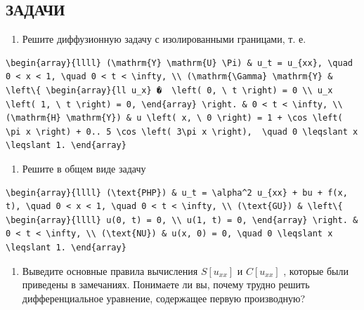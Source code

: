 \documentclass[
  ukrainian,
]{article}
\providecommand{\tightlist}{%
  \setlength{\itemsep}{0pt}\setlength{\parskip}{0pt}}
\begin{document}
\subsection{ЗАДАЧИ}\label{ux437ux430ux434ux430ux447ux438-4}

\begin{enumerate}
\def\labelenumi{\arabic{enumi}.}
\tightlist
\item
  Решите диффузионную задачу с изолированными границами, т. е.
\end{enumerate}

\begin{verbatim}
\begin{array}{llll} (\mathrm{Y} \mathrm{U} \Pi) & u_t = u_{xx}, \quad 0 < x < 1, \quad 0 < t < \infty, \\ (\mathrm{\Gamma} \mathrm{Y} & \left\{ \begin{array}{ll u_x} �  \left( 0, \ t \right) = 0 \\ u_x \left( 1, \ t \right) = 0, \end{array} \right. & 0 < t < \infty, \\ (\mathrm{H} \mathrm{Y}) & u \left( x, \ 0 \right) = 1 + \cos \left( \pi x \right) + 0.. 5 \cos \left( 3\pi x \right),  \quad 0 \leqslant x \leqslant 1. \end{array}
\end{verbatim}

\begin{enumerate}
\def\labelenumi{\arabic{enumi}.}
\setcounter{enumi}{1}
\tightlist
\item
  Решите в общем виде задачу
\end{enumerate}

\begin{verbatim}
\begin{array}{llll} (\text{PHP}) & u_t = \alpha^2 u_{xx} + bu + f(x, t), \quad 0 < x < 1, \quad 0 < t < \infty, \\ (\text{GU}) & \left\{ \begin{array}{llll} u(0, t) = 0, \\ u(1, t) = 0, \end{array} \right. & 0 < t < \infty, \\ (\text{NU}) & u(x, 0) = 0, \quad 0 \leqslant x \leqslant 1. \end{array}
\end{verbatim}

\begin{enumerate}
\def\labelenumi{\arabic{enumi}.}
\setcounter{enumi}{2}
\tightlist
\item
  Выведите основные правила вычисления \(S[u_{xx}]\) и \(C[u_{xx}]\) ,
  которые были приведены в замечаниях. Понимаете ли вы, почему трудно
  решить дифференциальное уравнение, содержащее первую производную?
\end{enumerate}
\end{document}
